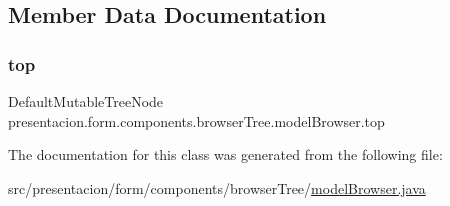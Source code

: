 \subsection{Member Data Documentation}
\mbox{\label{classpresentacion_1_1form_1_1components_1_1browserTree_1_1modelBrowser_a9fc1c6e81c509d87948fb3e47b79204b}} 
\subsubsection{\texorpdfstring{top}{top}}
{\footnotesize\ttfamily Default\+Mutable\+Tree\+Node presentacion.\+form.\+components.\+browser\+Tree.\+model\+Browser.\+top\hspace{0.3cm}{\ttfamily [package]}}



The documentation for this class was generated from the following file\+:\begin{DoxyCompactItemize}
\item 
src/presentacion/form/components/browser\+Tree/\hyperlink{modelBrowser_8java}{model\+Browser.\+java}\end{DoxyCompactItemize}
